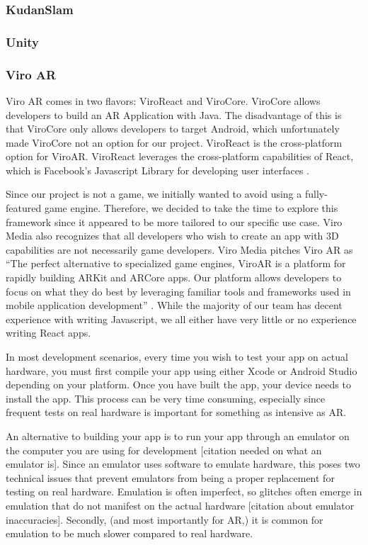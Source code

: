 \documentclass[a4paper, 10pt, american, titlepage]{article}
\begin{document}
\subsubsection{KudanSlam}
\label{sec:kudanSlam}

\subsubsection{Unity}
\label{sec:unity}

\subsubsection{Viro AR}
\label{sec:viroAR}

Viro AR comes in two flavors: ViroReact and ViroCore. ViroCore allows
developers to build an AR Application with Java. The disadvantage of this is
that ViroCore only allows developers to target Android, which unfortunately
made ViroCore not an option for our project. ViroReact is the cross-platform
option for ViroAR. ViroReact leverages the cross-platform capabilities of
React, which is Facebook's Javascript Library for developing user interfaces
\autocite{facebook2019}.

Since our project is not a game, we initially wanted to avoid using a
fully-featured game engine. Therefore, we decided to take the time to explore
this framework since it appeared to be more tailored to our specific use case.
Viro Media also recognizes that all developers who wish to create an app with
3D capabilities are not necessarily game developers. Viro Media pitches Viro
AR as ``The perfect alternative to specialized game engines, ViroAR is a
platform for rapidly building ARKit and ARCore apps. Our platform allows
developers to focus on what they do best by leveraging familiar tools and
frameworks used in mobile application development'' \autocite{viro2019}.
While the majority of our team has decent experience with writing Javascript,
we all either have very little or no experience writing React apps.

In most development scenarios, every time you wish to test your app on actual
hardware, you must first compile your app using either Xcode or Android Studio
depending on your platform. Once you have built the app, your device needs to
install the app. This process can be very time consuming, especially since
frequent tests on real hardware is important for something as intensive as
AR.

An alternative to building your app is to run your app through an emulator on
the computer you are using for development [citation needed on what an
emulator is]. Since an emulator uses software to emulate hardware, this poses
two technical issues that prevent emulators from being a proper replacement
for testing on real hardware.  Emulation is often imperfect, so glitches often
emerge in emulation that do not manifest on the actual hardware [citation
about emulator inaccuracies]. Secondly, (and most importantly for AR,)
it is common for emulation to be much slower compared to real hardware.
\end{document}
